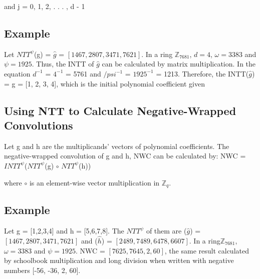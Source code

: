 \documentclass{techrep}
\theoremstyle{definition}
\theoremstyle{plain}
\newcommand{\Z}{\mathbb{Z}}
\begin{document}
and j = 0, 1, 2, . . . , d - 1

\subsection{Example}

Let ${NTT}^\psi$(g) = $\hat{g}$ = $[1467,2807,3471,7621]$. In a ring $\Z_{7681}$, $d = 4$, $\omega =3383$ and $\psi =1925$. Thus, the INTT of $\hat{g}$ can be calculated by matrix multiplication. In the equation $d^{-1}$ = $4^{-1}$ = 5761 and $/psi^{-1}$ = ${1925}^{-1}$ = 1213. Therefore, the INTT($\hat{g}$) = g = [1, 2, 3, 4], which is the initial polynomial coefficient given  

\subsection{Using NTT to Calculate Negative-Wrapped Convolutions}

Let g and h are the multiplicands’ vectors of polynomial coefficients. The negative-wrapped convolution of g and h, NWC can be calculated by:
NWC = ${INTT}^\psi$(${NTT}^\psi$(g) $\circ$ ${NTT}^\psi$(h))

where $\circ$ is an element-wise vector multiplication in $\Z_{q}$.

\subsection{Example}
Let g = [1,2,3,4] and h = [5,6,7,8]. The ${NTT}^\psi$ of them are ($\hat{g}$) = $[1467,2807,3471,7621]$ and ($\hat{h}$) = $[2489,7489,6478,6607]$. In a ring$\Z_{7681}$, $\omega =3383$ and $\psi =1925$. NWC = $[7625, 7645, 2, 60]$, the same result calculated by schoolbook multiplication and long division when written with negative numbers [-56, -36, 2, 60].
\end{document}
